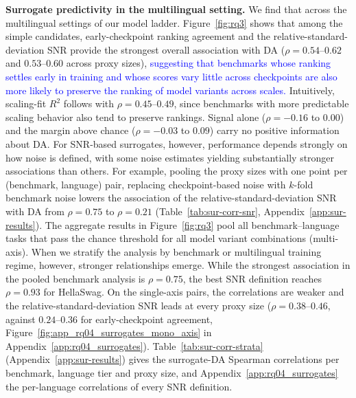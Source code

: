 \textbf{Surrogate predictivity in the multilingual setting.}
We find that  across the multilingual settings of our model ladder.
Figure~\ref{fig:rq3} shows that among the simple candidates, early-checkpoint ranking agreement and the relative-standard-deviation SNR provide the strongest overall association with DA ($\rho = 0.54$--$0.62$ and $0.53$--$0.60$ across proxy sizes), \textcolor{blue}{suggesting that benchmarks whose ranking settles early in training and whose scores vary little across checkpoints are also more likely to preserve the ranking of model variants across scales.} Intuitively, scaling-fit \(R^2\) follows with $\rho = 0.45$--$0.49$, since benchmarks with more predictable scaling behavior also tend to preserve rankings.
Signal alone ($\rho = -0.16$ to $0.00$) and the margin above chance ($\rho = -0.03$ to $0.09$) carry no positive information about DA. For SNR-based surrogates, however, performance depends strongly on how noise is defined, with some noise estimates yielding substantially stronger associations than others. For example, pooling the proxy sizes with one point per (benchmark, language) pair, replacing checkpoint-based noise with $k$-fold benchmark noise lowers the association of the relative-standard-deviation SNR with DA from \(\rho=0.75\) to \(\rho=0.21\) (Table~\ref{tab:sur-corr-snr}, Appendix~\ref{app:sur-results}).
The aggregate results in Figure~\ref{fig:rq3} pool all benchmark--language tasks that pass the chance threshold for all model variant combinations (\ie multi-axis). When we stratify the analysis by benchmark or multilingual training regime, however, stronger relationships emerge. While the strongest association in the pooled benchmark analysis is \(\rho=0.75\), the best SNR definition reaches \(\rho=0.93\) for HellaSwag. 
On the single-axis pairs, the correlations are weaker and the relative-standard-deviation SNR leads at every proxy size ($\rho = 0.38$--$0.46$, against $0.24$--$0.36$ for early-checkpoint agreement, Figure~\ref{fig:app_rq04_surrogates_mono_axis} in Appendix~\ref{app:rq04_surrogates}).
Table~\ref{tab:sur-corr-strata} (Appendix~\ref{app:sur-results}) gives the surrogate-DA Spearman correlations per benchmark, language tier and proxy size, and Appendix~\ref{app:rq04_surrogates} the per-language correlations of every SNR definition.


